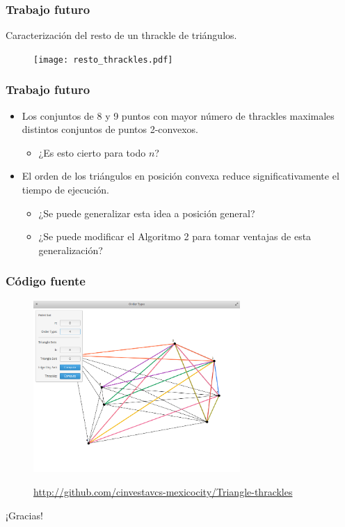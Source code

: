 \documentclass{beamer}
\begin{document}
\begin{frame}
  \frametitle{Trabajo futuro}
  Caracterización del resto de un thrackle de triángulos.
  \begin{figure}
    \texttt{[image: resto\_thrackles.pdf]}
  \end{figure}
\end{frame}

\begin{frame}
  \frametitle{Trabajo futuro}
  \begin{itemize}
    \item Los conjuntos de 8 y 9 puntos con mayor número de thrackles maximales
      distintos conjuntos de puntos 2-convexos.
      \begin{itemize}
        \item ¿Es esto cierto para todo $n$?
      \end{itemize}
      \vspace{0.5cm}
    \item El orden de los triángulos en posición convexa reduce
      significativamente el tiempo de ejecución.
      \begin{itemize}
        \item ¿Se puede generalizar esta idea a posición general?
        \item ¿Se puede modificar el Algoritmo 2 para tomar ventajas de esta generalización?
      \end{itemize}
  \end{itemize}
\end{frame}

\begin{frame}
  \frametitle{Código fuente}
  \begin{figure}[htb]
    \includegraphics[width=0.7\textwidth]{aplicacion.png}

    \url{http://github.com/cinvestavcs-mexicocity/Triangle-thrackles}
  \end{figure}
\end{frame}

\begin{frame}[c]
  \begin{center}
    \Huge ¡Gracias!
  \end{center}
\end{frame}
\end{document}
